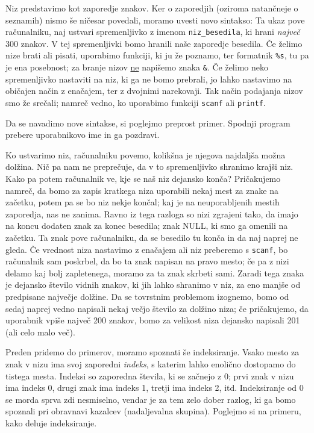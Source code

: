 Niz predstavimo kot zaporedje znakov.
Ker o zaporedjih (oziroma natančneje o seznamih) nismo še ničesar povedali,
moramo uvesti novo sintakso:
Ta ukaz pove računalniku, naj ustvari spremenljivko z imenom
\verb+niz_besedila+, ki hrani \emph{največ} 300 znakov.
V tej spremenljivki bomo hranili naše zaporedje besedila.
Če želimo nize brati ali pisati, uporabimo funkciji, ki ju že poznamo, ter
formatnik \verb+%s+, tu pa je ena posebnost; za branje nizov \underline{ne}
napišemo znaka \verb+&+.
Če želimo neko spremenljivko nastaviti na niz, ki ga ne bomo prebrali, jo lahko
nastavimo na običajen način z enačajem, ter z dvojnimi narekovaji.
Tak način podajanja nizov smo že srečali; namreč vedno, ko uporabimo funkciji
\verb+scanf+ ali \verb+printf+.

\begin{examples}
  Da se navadimo nove sintakse, si poglejmo preprost primer.
  Spodnji program prebere uporabnikovo ime in ga pozdravi.
\end{examples}

Ko ustvarimo niz, računalniku povemo, kolikšna je njegova najdaljša možna
dolžina.
Nič pa nam ne preprečuje, da v to spremenljivko shranimo krajši niz.
Kako pa potem računalnik ve, kje se naš niz dejansko konča?
Pričakujemo namreč, da bomo za zapis kratkega niza uporabili nekaj mest za znake
na začetku, potem pa se bo niz nekje končal; kaj je na neuporabljenih mestih
zaporedja, nas ne zanima.
Ravno iz tega razloga so nizi zgrajeni tako, da imajo na koncu dodaten znak za
konec besedila; znak NULL, ki smo ga omenili na začetku.
Ta znak pove računalniku, da se besedilo tu konča in da naj naprej ne gleda.
Če vrednost niza nastavimo z enačajem ali niz preberemo s \verb+scanf+, bo
računalnik sam poskrbel, da bo ta znak napisan na pravo mesto; če pa z nizi
delamo kaj bolj zapletenega, moramo za ta znak skrbeti sami.
Zaradi tega znaka je dejansko število vidnih znakov, ki jih lahko shranimo v
niz, za eno manjše od predpisane največje dolžine.
Da se tovrstnim problemom izognemo, bomo od sedaj naprej vedno napisali nekaj
večjo število za dolžino niza; če pričakujemo, da uporabnik vpiše največ 200
znakov, bomo za velikost niza dejansko napisali 201 (ali celo malo več).

Preden pridemo do primerov, moramo spoznati še indeksiranje.
Vsako mesto za znak v nizu ima svoj zaporedni \textit{indeks}, s katerim
lahko enolično dostopamo do tistega mesta.
Indeksi so zaporedna števila, ki se začnejo z 0; prvi znak v nizu ima indeks 0,
drugi znak ima indeks 1, tretji ima indeks 2, itd.
Indeksiranje od 0 se morda sprva zdi nesmiselno, vendar je za tem zelo dober
razlog, ki ga bomo spoznali pri obravnavi kazalcev (nadaljevalna skupina).
Poglejmo si na primeru, kako deluje indeksiranje.

